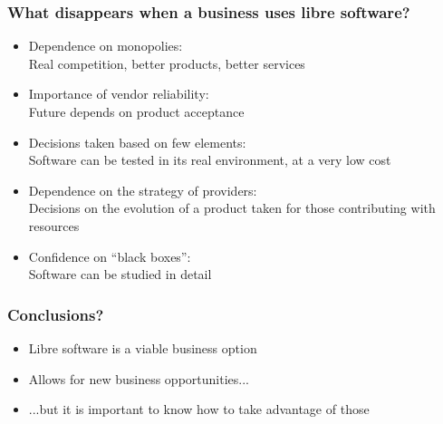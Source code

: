 
\begin{frame}
\frametitle{What disappears when a business uses libre software?}

\begin{itemize}
\item Dependence on monopolies: \\
  Real competition, better products, better services
\item Importance of vendor reliability: \\
  Future depends on product acceptance
\item Decisions taken based on few elements: \\
  Software can be tested in its real environment, at a very low cost
\item Dependence on the strategy of providers: \\
  Decisions on the evolution of a product taken for those contributing with resources
\item Confidence on ``black boxes'': \\
  Software can be studied in detail
\end{itemize}
\end{frame}


\begin{frame}
\frametitle{Conclusions?}

\begin{itemize}
\item Libre software is a viable business option
\item Allows for new business opportunities...
\item ...but it is important to know how to take advantage of those
\end{itemize}

\end{frame}





